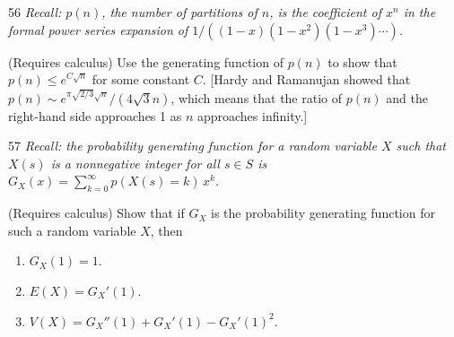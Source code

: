 \documentclass[11pt]{article}
\begin{document}
\begin{exercise}{56}
    \textit{Recall: $p(n)$, the number of partitions of $n$, is the
    coefficient of $x^n$ in the formal power series expansion of
    $1/((1-x)(1-x^2)(1-x^3)\cdots)$.}

    (Requires calculus) Use the generating function of $p(n)$ to show
    that $p(n) \leq e^{C\sqrt{n}}$ for some constant $C$. [Hardy and
    Ramanujan showed that
    $p(n) \sim e^{\pi\sqrt{2/3}\sqrt{n}}/(4\sqrt{3}n)$, which means
    that the ratio of $p(n)$ and the right-hand side approaches 1 as
    $n$ approaches infinity.]
\end{exercise}

\begin{exercise}{57}
    \textit{Recall: the probability generating function for a random
    variable $X$ such that $X(s)$ is a nonnegative integer for all
    $s \in S$ is $G_X(x) = \sum_{k=0}^{\infty} p(X(s)=k)\, x^k$.}

    (Requires calculus) Show that if $G_X$ is the probability
    generating function for such a random variable $X$, then
    \begin{enumerate}[label=(\alph*)]
        \item $G_X(1) = 1$.
        \item $E(X) = G_X'(1)$.
        \item $V(X) = G_X''(1) + G_X'(1) - G_X'(1)^2$.
    \end{enumerate}
\end{exercise}
\end{document}
